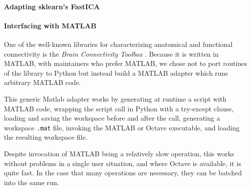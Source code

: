 \paragraph{Adapting sklearn's FastICA}



\paragraph{Interfacing with MATLAB}

One of the well-known libraries for characterizing anatomical 
and functional connectivity is the \emph{Brain Connectivity Toolbox} 
\cite{Rubinov_2010}. 
Because it is written in MATLAB, with maintainers who prefer MATLAB, we 
chose not to port routines of the library to Python but instead build
a MATLAB adapter which runs arbitrary MATLAB code. 

This generic Matlab adapter works by generating at runtime a script with MATLAB code, 
wrapping the script call in Python with a try-except clause,  
loading and saving the workspace before and after the call,
generating a workspace \texttt{.mat} file, invoking the MATLAB or Octave
executable, and loading the resulting workspace file. 

Despite invocation of MATLAB being a relatively slow operation, this works
without problems in a single user situation, and where Octave is available, it
is quite fast. In the case that many operations are necessary, they can be
batched into the same run.
